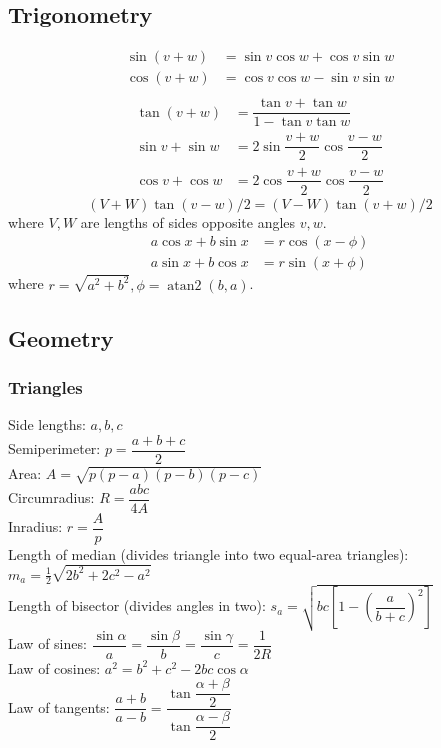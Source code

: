 \begin{multicols}{\Columns}
\subsection{Trigonometry}
\begin{align*}
\sin(v+w)&{}=\sin v\cos w+\cos v\sin w\\
\cos(v+w)&{}=\cos v\cos w-\sin v\sin w\\
\end{align*}
\begin{align*}
\tan(v+w)&{}=\dfrac{\tan v+\tan w}{1-\tan v\tan w}\\
\sin v+\sin w&{}=2\sin\dfrac{v+w}{2}\cos\dfrac{v-w}{2}\\
\cos v+\cos w&{}=2\cos\dfrac{v+w}{2}\cos\dfrac{v-w}{2}
\end{align*}
\[ (V+W)\tan(v-w)/2{}=(V-W)\tan(v+w)/2 \]
where $V, W$ are lengths of sides opposite angles $v, w$.
\begin{align*}
	a\cos x+b\sin x&=r\cos(x-\phi)\\
	a\sin x+b\cos x&=r\sin(x+\phi)
\end{align*}
where $r=\sqrt{a^2+b^2}, \phi=\operatorname{atan2}(b,a)$.

\subsection{Geometry}

\subsubsection{Triangles}
Side lengths: $a,b,c$\\
Semiperimeter: $p=\dfrac{a+b+c}{2}$\\
Area: $A=\sqrt{p(p-a)(p-b)(p-c)}$\\
Circumradius: $R=\dfrac{abc}{4A}$\\
Inradius: $r=\dfrac{A}{p}$\\
Length of median (divides triangle into two equal-area triangles): $m_a=\tfrac{1}{2}\sqrt{2b^2+2c^2-a^2}$\\
Length of bisector (divides angles in two): $s_a=\sqrt{bc\left[1-\left(\dfrac{a}{b+c}\right)^2\right]}$\\
Law of sines: $\dfrac{\sin\alpha}{a}=\dfrac{\sin\beta}{b}=\dfrac{\sin\gamma}{c}=\dfrac{1}{2R}$\\
Law of cosines: $a^2=b^2+c^2-2bc\cos\alpha$\\
Law of tangents: $\dfrac{a+b}{a-b}=\dfrac{\tan\dfrac{\alpha+\beta}{2}}{\tan\dfrac{\alpha-\beta}{2}}$\\


\end{multicols}

